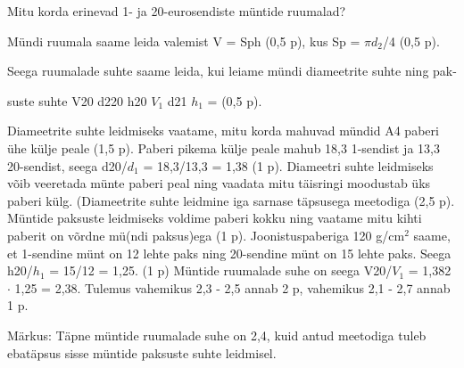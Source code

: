 
Mitu korda erinevad 1- ja 20-eurosendiste müntide ruumalad?

\hint

\solu
Mündi ruumala saame leida valemist V = Sph (0,5 p), kus Sp = $\pi$$d_2$/4 (0,5 p).

Seega ruumalade suhte saame leida, kui leiame mündi diameetrite suhte ning pak-

suste suhte V20 d220 h20 $V_1$ d21 $h_1$ = (0,5 p).

Diameetrite suhte leidmiseks vaatame, mitu korda mahuvad mündid A4 paberi ühe külje peale (1,5 p). Paberi pikema külje peale mahub 18,3 1-sendist ja 13,3 20-sendist, seega d20/$d_1$ = 18,3/13,3 = 1,38 (1 p). Diameetri suhte leidmiseks võib veeretada münte paberi peal ning vaadata mitu täisringi moodustab üks paberi külg. (Diameetrite suhte leidmine iga sarnase täpsusega meetodiga (2,5 p). Müntide paksuste leidmiseks voldime paberi kokku ning vaatame mitu kihti paberit on võrdne mü(ndi paksus)ega (1 p). Joonistuspaberiga 120 g/cm$^2$ saame, et 1-sendine münt on 12 lehte paks ning 20-sendine münt on 15 lehte paks. Seega h20/$h_1$ = 15/12 = 1,25. (1 p) Müntide ruumalade suhe on seega V20/$V_1$ = 1,382 $\cdot$ 1,25 = 2,38. Tulemus vahemikus 2,3 - 2,5 annab 2 p, vahemikus 2,1 - 2,7 annab 1 p.

Märkus: Täpne müntide ruumalade suhe on 2,4, kuid antud meetodiga tuleb ebatäpsus sisse müntide paksuste suhte leidmisel.
\probend
